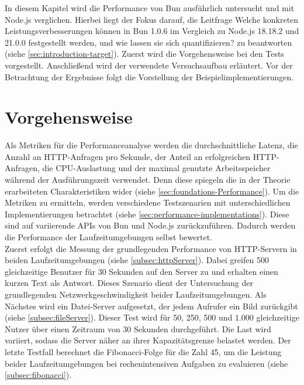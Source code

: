  \label{ch:performanceAnalysis}
In diesem Kapitel wird die Performance von Bun ausführlich untersucht und mit Node.js verglichen. Hierbei liegt der Fokus darauf, die Leitfrage \glqq Welche konkreten Leistungsverbesserungen können in Bun 1.0.6 im Vergleich zu Node.js 18.18.2 und 21.0.0 festgestellt werden, und wie lassen sie sich quantifizieren?\grqq{} zu beantworten (siehe \autoref{sec:introduction-target}). Zuerst wird die Vorgehensweise bei den Tests vorgestellt. Anschließend wird der verwendete Versuchsaufbau erläutert. Vor der Betrachtung der Ergebnisse folgt die Vorstellung der Beispielimplementierungen.


\section{Vorgehensweise} \label{sec:performance-approach}
Als Metriken für die Performanceanalyse werden die durchschnittliche Latenz, die Anzahl an HTTP-Anfragen pro Sekunde, der Anteil an erfolgreichen HTTP-Anfragen, die CPU-Auslastung und der maximal genutzte Arbeitsspeicher während der Ausführungszeit verwendet. Denn diese spiegeln die in der Theorie erarbeiteten Charakteristiken wider (siehe \autoref{sec:foundations-Performance}). Um die Metriken zu ermitteln, werden verschiedene Testszenarien mit unterschiedlichen Implementierungen betrachtet (siehe \autoref{sec:performance-implementations}). Diese sind auf variierende APIs von Bun und Node.js zurückzuführen. Dadurch werden die Performance der Laufzeitumgebungen selbst bewertet.\\

\noindent
Zuerst erfolgt die Messung der grundlegenden Performance von HTTP-Servern in beiden Laufzeitumgebungen (siehe \autoref{subsec:httpServer}). Dabei greifen 500 gleichzeitige Benutzer für 30 Sekunden auf den Server zu und erhalten einen kurzen Text als Antwort. Dieses Szenario dient der Untersuchung der grundlegenden Netzwerkgeschwindigkeit beider Laufzeitumgebungen. Als Nächstes wird ein Datei-Server aufgesetzt, der jedem Aufrufer ein Bild zurückgibt (siehe \autoref{subsec:fileServer}). Dieser Test wird für 50, 250, 500 und 1.000 gleichzeitige Nutzer über einen Zeitraum von 30 Sekunden durchgeführt. Die Last wird variiert, sodass die Server näher an ihrer Kapazitätsgrenze belastet werden. Der letzte Testfall berechnet die Fibonacci-Folge für die Zahl 45, um die Leistung beider Laufzeitumgebungen bei rechenintensiven Aufgaben zu evaluieren (siehe \autoref{subsec:fibonacci}).


